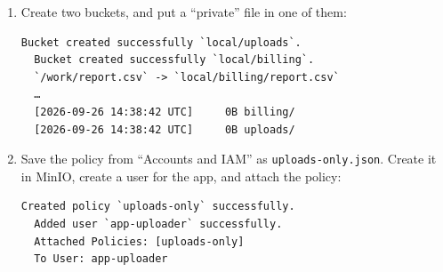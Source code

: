 \begin{enumerate}
\begin{codeblock}
  \end{codeblock}
\item
  Create two buckets, and put a ``private'' file in one of them:

  \begin{codeblock}

\begin{Shaded}
\begin{Highlighting}[]
  \OperatorTok{\textgreater{}}
\end{Highlighting}
\end{Shaded}

  \end{codeblock}

  \begin{codeblock}
  \begin{Verbatim}[formatcom=\outputstyle]
  Bucket created successfully `local/uploads`.
  Bucket created successfully `local/billing`.
  `/work/report.csv` -> `local/billing/report.csv`
  …
  [2026-09-26 14:38:42 UTC]     0B billing/
  [2026-09-26 14:38:42 UTC]     0B uploads/
  \end{Verbatim}
  \end{codeblock}
\item
  Save the policy from ``Accounts and IAM'' as \texttt{uploads-only.json}. Create it in MinIO, create a user for the app, and attach the policy:

  \begin{codeblock}

\begin{Shaded}
\begin{Highlighting}[]
\end{Highlighting}
\end{Shaded}

  \end{codeblock}

  \begin{codeblock}
  \begin{Verbatim}[formatcom=\outputstyle]
  Created policy `uploads-only` successfully.
  Added user `app-uploader` successfully.
  Attached Policies: [uploads-only]
  To User: app-uploader
  \end{Verbatim}
  \end{codeblock}


\end{enumerate}
